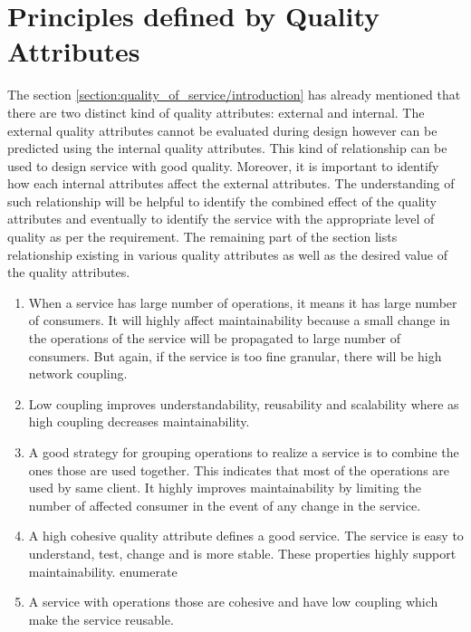 {{{{{{{{\section{Principles defined by Quality Attributes}{\label{section:quality_of_service/quality_attributes_principle}
The section \ref{section:quality_of_service/introduction} has already mentioned that there are two distinct kind of quality attributes: external and internal. The external quality attributes cannot be evaluated during design however can be predicted using the internal quality attributes. This kind of relationship can be used to design service with good quality. Moreover, it is important to identify how each internal attributes affect the external attributes. The understanding of such relationship will be helpful to identify the combined effect of the quality attributes and eventually to identify the service with the appropriate level of quality as per the requirement.
The remaining part of the section lists relationship existing in various quality attributes as well as the desired value of the quality attributes.
\begin{enumerate}
\item When a service has large number of operations, it means it has large number of consumers. It will highly affect maintainability because a small change in the operations of the service will be propagated to large number of consumers. But again, if the service is too fine granular, there will be high network coupling. \cite{Feuerlicht:2007aa, Xiao-jun:2015aa}\cite{Bianco:2007aa}

\item Low coupling improves understandability, reusability and scalability where as high coupling decreases maintainability. \cite{Kazemi:2011aa}\cite{Erl:2005aa}\cite{Josuttis:2007aa}

\item A good strategy for grouping operations to realize a service is to combine the ones those are used together.  This indicates that most of the operations are used by same client.  It highly improves maintainability by limiting the number of affected consumer in the event of any change in the service. \cite{Xiao-jun:2015aa}

\item A high cohesive quality attribute defines a good service. The service is easy to understand, test, change and is more stable. These properties highly support maintainability. {enumerate}\cite{np:2001aa}

\item A service with operations those are cohesive and have low coupling which make the service reusable. \cite{Washizakia:2003aa}\cite{Feuerlicht:2007aa}\cite{Ma:2009aa}


\end{enumerate}}}}}}}}}}

